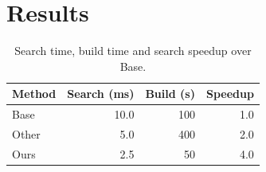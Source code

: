\documentclass{article}\usepackage{booktabs}
\begin{document}
\section{Results}
\begin{table}[h]\centering\caption{Search time, build time and search speedup over Base.}\label{tab:a}
\begin{tabular}{lrrr}
\toprule
Method & Search (ms) & Build (s) & Speedup \\
\midrule
Base & 10.0 & 100 & 1.0 \\
Other & 5.0 & 400 & 2.0 \\
Ours & 2.5 & 50 & 4.0 \\
\bottomrule
\end{tabular}\end{table}
\end{document}
